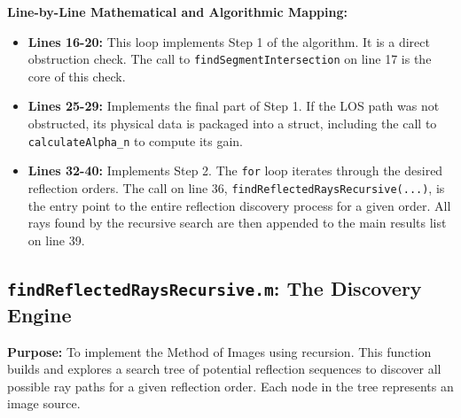 \documentclass{article}
\begin{document}
	\textbf{Line-by-Line Mathematical and Algorithmic Mapping:}
	\begin{itemize}
		\item \textbf{Lines 16-20:} This loop implements Step 1 of the algorithm. It is a direct obstruction check. The call to \texttt{findSegmentIntersection} on line 17 is the core of this check.
		\item \textbf{Lines 25-29:} Implements the final part of Step 1. If the LOS path was not obstructed, its physical data is packaged into a struct, including the call to \texttt{calculateAlpha\_n} to compute its gain.
		\item \textbf{Lines 32-40:} Implements Step 2. The \texttt{for} loop iterates through the desired reflection orders. The call on line 36, \texttt{findReflectedRaysRecursive(...)}, is the entry point to the entire reflection discovery process for a given order. All rays found by the recursive search are then appended to the main results list on line 39.
	\end{itemize}
	
	\subsection{\texttt{findReflectedRaysRecursive.m}: The Discovery Engine}
	\textbf{Purpose:} To implement the Method of Images using recursion. This function builds and explores a search tree of potential reflection sequences to discover all possible ray paths for a given reflection order. Each node in the tree represents an image source.
	
\end{document}
